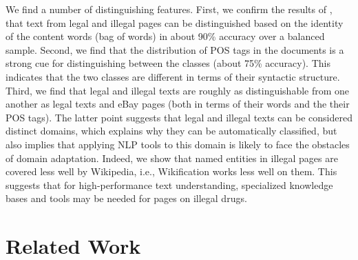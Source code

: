 \documentclass[11pt,a4paper,table]{article}
\begin{document}
  We find a number of distinguishing features. First, we confirm the results of \citet{Avarikioti18}, 
	that text from legal and illegal pages can be distinguished based on the identity of the content words (bag of words) 
  in about 90\% accuracy over a balanced sample. Second, we find that the distribution of POS tags in the documents is a strong cue for 
	distinguishing between the classes (about 75\% accuracy). This indicates that the two classes are different in 
	terms of their syntactic structure. Third, we find that legal and illegal texts are roughly as distinguishable from one another as legal 
	texts and eBay pages (both in terms of their words and the their POS tags). 
	The latter point suggests that legal and illegal texts can be considered distinct domains, which explains why they can be 
	automatically classified, but also implies that applying NLP tools to this domain is likely to face the obstacles of domain adaptation.  
  Indeed, we show that named entities in illegal pages are covered less well by Wikipedia, i.e., Wikification works less well on them.
  This suggests that for high-performance text understanding, specialized knowledge bases and tools may be needed for pages on illegal drugs.
  
	
%   
%   
%   
%
%
%
%

\section{Related Work}
\end{document}

